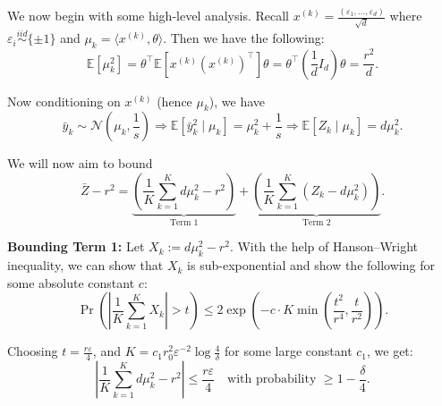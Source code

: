 \noindent
We now begin with some high-level analysis. Recall $x^{(k)} = \frac{(\varepsilon_1, \ldots, \varepsilon_d)}{\sqrt{d}}$ where $\varepsilon_i\overset{iid}{\sim} \{ \pm 1 \}$ and $ \mu_k = \langle x^{(k)}, \theta \rangle$. Then we have the following:
\[
\mathbb{E}[\mu^2_k] = \theta^\top \mathbb{E}\left[  x^{(k)} (x^{(k)})^\top\right] \theta 
= \theta^\top \left( \frac{1}{d} I_d \right) \theta = \frac{r^2}{d}
.\]

\noindent
Now conditioning on $x^{(k)}$ (hence $\mu_k$), we have
\[
\bar{y}_k \sim \mathcal{N}\left(\mu_k, \frac{1}{s}\right)
\Rightarrow \mathbb{E}[\bar{y}_k^2 \mid \mu_k] = \mu_k^2 + \frac{1}{s}\Rightarrow \mathbb{E}[Z_k \mid \mu_k] = d \mu_k^2.
\]



\noindent
We will now aim to bound
\[
\bar{Z} - r^2 
= \underbrace{\left( \frac{1}{K} \sum_{k=1}^{K} d\mu_k^2 - r^2 \right)}_{\text{Term 1}}
+ \underbrace{\left( \frac{1}{K} \sum_{k=1}^{K} \left( Z_k - d\mu_k^2 \right) \right)}_{\text{Term 2}}.
\]

\noindent
\textbf{Bounding Term 1:}
Let $X_k := d \mu_k^2 - r^2$.  
With the help of Hanson–Wright inequality, we can show that $X_k$ is sub-exponential and show the following for some absolute constant $c$:
\begin{equation}\label{main-eq:bounding-term-1}
    \Pr\left( \left| \frac{1}{K} \sum_{k=1}^{K} X_k \right| > t \right) 
\leq 2 \exp\left( -c\cdot K \min\left( \frac{t^2}{r^4}, \frac{t}{r^2} \right) \right).
\end{equation}

\noindent
Choosing $t = \frac{r \varepsilon}{4}$, and $K = c_1 r_0^2 \varepsilon^{-2} \log \frac{4}{\delta}$ for some large constant $c_1$,  
we get:
\[
\left| \frac{1}{K} \sum_{k=1}^{K} d\mu_k^2 - r^2 \right| 
\leq \frac{r \varepsilon}{4} \quad \text{with probability } \geq 1 - \frac{\delta}{4}.
\]


